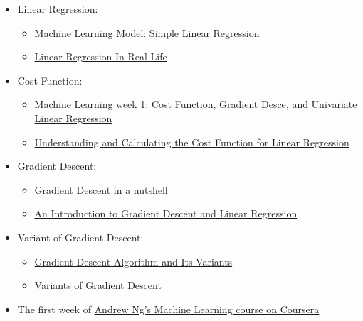 \documentclass{42-en}
\begin{document}
\begin{itemize}
    \item Linear Regression:
    \begin{itemize}
        \item \href{https://medium.com/datadriveninvestor/machine-learning-model-simple-linear-regression-dbedb22ce200}{Machine Learning Model: Simple Linear Regression}
        \item \href{https://towardsdatascience.com/linear-regression-in-real-life-4a78d7159f16}{Linear Regression In Real Life}
    \end{itemize}
    \item Cost Function:
\begin{itemize}    
        \item \href{https://medium.com/@lachlanmiller_52885/machine-learning-week-1-cost-function-gradient-descent-and-univariate-linear-regression-8f5fe69815fd}{Machine Learning week 1: Cost Function, Gradient Desce, and Univariate Linear Regression}
        \item \href{https://medium.com/@lachlanmiller_52885/understanding-and-calculating-the-cost-function-for-linear-regression-39b8a3519fcb}{Understanding and Calculating the Cost Function for Linear Regression}
    \end{itemize}
    \item Gradient Descent:
    \begin{itemize}
        \item \href{https://towardsdatascience.com/gradient-descent-in-a-nutshell-eaf8c18212f0}{Gradient Descent in a nutshell}
        \item \href{https://spin.atomicobject.com/2014/06/24/gradient-descent-linear-regression/}{An Introduction to Gradient Descent and Linear Regression}
    \end{itemize}
    \item Variant of Gradient Descent:
    \begin{itemize}
        \item \href{https://towardsdatascience.com/gradient-descent-algorithm-and-its-variants-10f652806a3}{Gradient Descent Algorithm and Its Variants}
        \item \href{https://medium.com/@sunil.jangir07/variants-of-gradient-descent-5f5464c82f28}{Variants of Gradient Descent}
    \end{itemize}
    \item The first week of \href{https://www.coursera.org/learn/machine-learning}{Andrew Ng’s Machine Learning course on Coursera}
\end{itemize}
\end{document}

